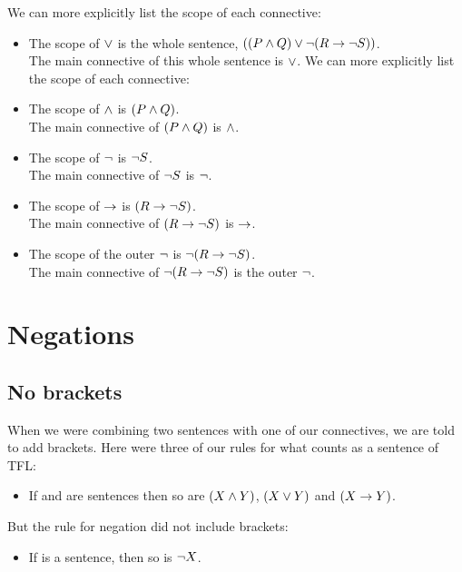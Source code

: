 We can more explicitly list the scope of each connective:

\begin{itemize}
	\item The scope of $\vee$ is the whole sentence, $((P \mathbin{\wedge} Q)\vee \neg(R \rightarrow \neg S))$. \\The main connective of this whole sentence is $\vee$.
We can more explicitly list the scope of each connective:

	\item The scope of $\mathbin{\wedge}$ is $(P \mathbin{\wedge} Q)$.\\
	The main connective of $(P \mathbin{\wedge} Q)$ is $\mathbin{\wedge}$.
	
	\item The scope of $\neg$ is $\neg S$.\\
	The main connective of $\neg S$ is $\neg$.
	
	\item The scope of $\rightarrow$ is $(R \rightarrow \neg S)$.\\
	The main connective of $(R \rightarrow \neg S)$ is $\rightarrow$.
	
	\item The scope of the outer $\neg$ is $\neg(R \rightarrow \neg S)$.\\
	The main connective of $\neg(R \rightarrow \neg S)$ is the outer $\neg$.
	
\end{itemize}

\section{Negations}
\subsection{No brackets}

When we were combining two sentences with one of our connectives, we are told to add brackets. Here were three of our rules for what counts as a sentence of TFL: 
\begin{itemize}
	\item [3.-5.] If \metaX and \metaY are sentences then so are $(X\mathbin{\wedge}Y)$, $(X\vee Y)$ and $(X\rightarrow Y)$. 
\end{itemize}
But the rule for negation did not include brackets: 
	\begin{itemize}
	\item [2.] If \metaX is a sentence, then so is $\neg X$.
\end{itemize}

